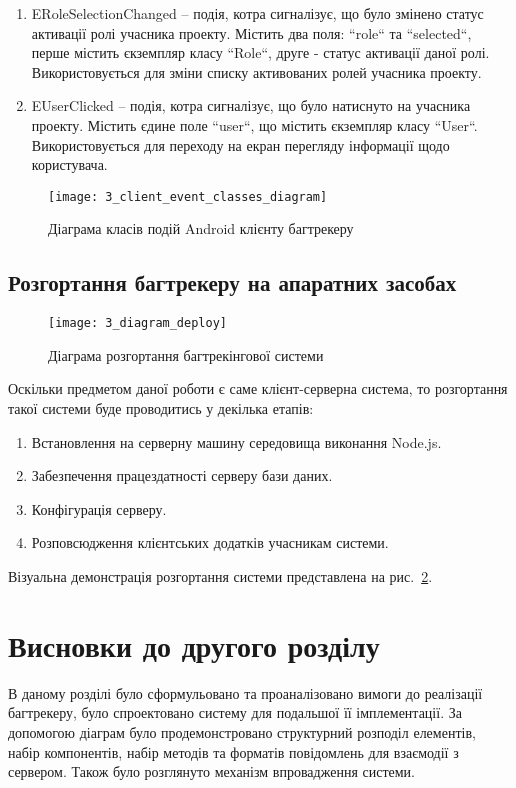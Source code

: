 \documentclass[../main.tex]{subfiles}
\begin{document}
\begin{enumerate}
			\item ERoleSelectionChanged -- подія, котра сигналізує, що було змінено статус активації ролі учасника проекту. Містить два поля: ``role`` та ``selected``, перше містить єкземпляр класу ``Role``, друге - статус активації даної ролі. Використовується для зміни списку активованих ролей учасника проекту.
			\item EUserClicked -- подія, котра сигналізує, що було натиснуто на учасника проекту. Містить єдине поле ``user``, що містить єкземпляр класу ``User``. Використовується для переходу на екран перегляду інформації щодо користувача.
		\end{enumerate}
		
		\begin{figure}[H]
			\centering
			\texttt{[image: 3\_client\_event\_classes\_diagram]}
			\caption{Діаграма класів подій Android клієнту багтрекеру}
			\label{client_events}
		\end{figure}
	
	\subsection{Розгортання багтрекеру на апаратних засобах}
	
		\begin{figure}[H]
			\centering
			\texttt{[image: 3\_diagram\_deploy]}
			\caption{Діаграма розгортання багтрекінгової системи}
			\label{diagram_deploy}
		\end{figure}
	
		Оскільки предметом даної роботи є саме клієнт-серверна система, то розгортання такої системи буде проводитись у декілька етапів:
		\begin{enumerate}
			\item Встановлення на серверну машину середовища виконання Node.js.
			\item Забезпечення працездатності серверу бази даних.
			\item Конфігурація серверу.
			\item Розповсюдження клієнтських додатків учасникам системи.
		\end{enumerate}
		
		Візуальна демонстрація розгортання системи представлена на рис.~\ref{diagram_deploy}. %

\section{Висновки до другого розділу}
	В даному розділі було сформульовано та проаналізовано вимоги до реалізації багтрекеру, було спроектовано систему для подальшої її імплементації. За допомогою діаграм було продемонстровано структурний розподіл елементів, набір компонентів, набір методів та форматів повідомлень для взаємодії з сервером. Також було розглянуто механізм впровадження системи. 
	
\end{document}
